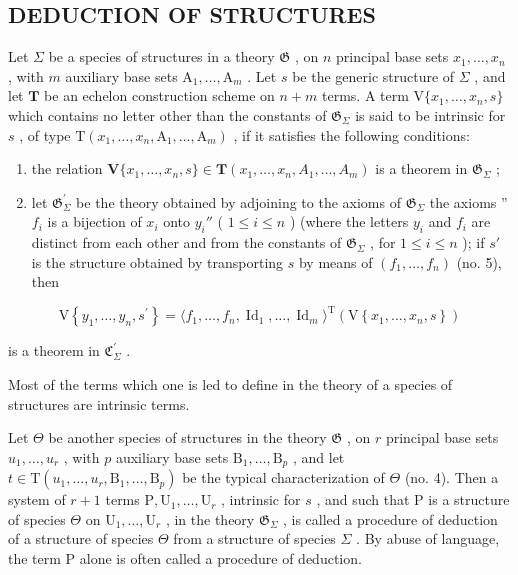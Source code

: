 \subsection{DEDUCTION OF STRUCTURES}

Let \(\Sigma\) be a species of structures in a theory \(\mathfrak{G}\) , on \(n\) principal base sets \(x_{1},\ldots ,x_{n}\) , with \(m\) auxiliary base sets \(\mathrm{A}_1,\dots ,\mathrm{A}_m\) . Let \(s\) be the generic structure of \(\Sigma\) , and let \(\mathbf{T}\) be an echelon construction scheme on \(n + m\) terms. A term \(\mathrm{V}\{x_1,\dots,x_n,s\}\) which contains no letter other than the constants of \(\mathfrak{G}_{\Sigma}\) is said to be intrinsic for \(s\) , of type \(\mathrm{T}(x_1,\dots,x_n,\mathrm{A}_1,\dots,\mathrm{A}_m)\) , if it satisfies the following conditions:

\begin{enumerate}
\def\labelenumi{(\arabic{enumi})}
\item
  the relation \(\mathbf{V}\{x_1, \ldots, x_n, s\} \in \mathbf{T}(x_1, \ldots, x_n, A_1, \ldots, A_m)\) is a theorem in \(\mathfrak{G}_{\Sigma}\) ;
\item
  let \(\mathfrak{G}_{\Sigma}^{\prime}\) be the theory obtained by adjoining to the axioms of \(\mathfrak{G}_{\Sigma}\) the axioms '' \(f_{i}\) is a bijection of \(x_{i}\) onto \(y_{i}''\) ( \(1 \leqslant i \leqslant n\) ) (where the letters \(y_{i}\) and \(f_{i}\) are distinct from each other and from the constants of \(\mathfrak{G}_{\Sigma}\) , for \(1 \leqslant i \leqslant n\) ); if \(s'\) is the structure obtained by transporting \(s\) by means of \((f_{1}, \ldots, f_{n})\) (no. 5), then
\end{enumerate}

\[
\mathrm{V} \left\{y _ {1}, \dots , y _ {n}, s ^ {\prime} \right\} = \langle f _ {1}, \dots , f _ {n}, \operatorname{Id} _ {1}, \dots , \operatorname{Id} _ {m} \rangle^ {\mathrm{T}} (\mathrm{V} \left\{x _ {1}, \dots , x _ {n}, s \right\})
\]

is a theorem in \(\mathfrak{C}_{\Sigma}^{\prime}\) .

Most of the terms which one is led to define in the theory of a species of structures are intrinsic terms.

Let \(\Theta\) be another species of structures in the theory \(\mathfrak{G}\) , on \(r\) principal base sets \(u_{1},\ldots,u_{r}\) , with \(p\) auxiliary base sets \(\mathrm{B}_{1},\ldots,\mathrm{B}_{p}\) , and let \(t\in\mathrm{T}(u_{1},\ldots,u_{r},\mathrm{B}_{1},\ldots,\mathrm{B}_{p})\) be the typical characterization of \(\Theta\) (no. 4). Then a system of \(r+1\) terms \(\mathrm{P},\mathrm{U}_{1},\ldots,\mathrm{U}_{r}\) , intrinsic for \(s\) , and such that \(\mathrm{P}\) is a structure of species \(\Theta\) on \(\mathrm{U}_{1},\ldots,\mathrm{U}_{r}\) , in the theory \(\mathfrak{G}_{\Sigma}\) , is called a procedure of deduction of a structure of species \(\Theta\) from a structure of species \(\Sigma\) . By abuse of language, the term \(\mathrm{P}\) alone is often called a procedure of deduction.


